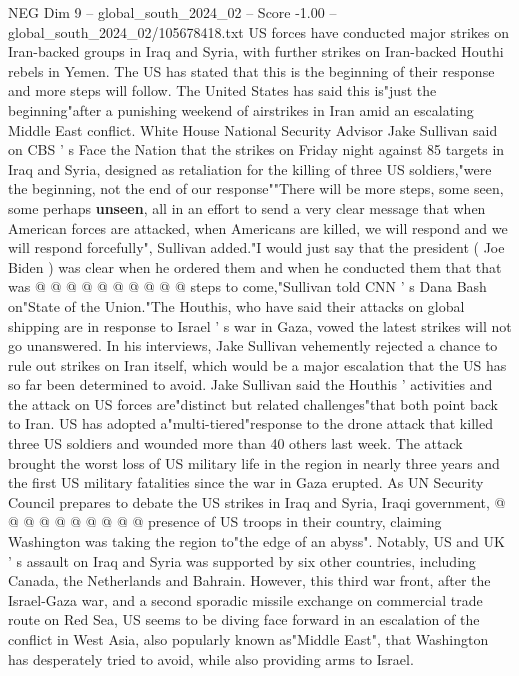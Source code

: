 \begin{textsample}{NEG Dim 9 – global\_south\_2024\_02 – Score -1.00 – global\_south\_2024\_02/105678418.txt}  \label{ex:f9_neg_364}
US forces have conducted major strikes on Iran-backed groups in Iraq and Syria, with further strikes on Iran-backed Houthi rebels in Yemen.
The US has stated that this is the beginning of their response and more steps will follow.
The United States has said this is"just the beginning"after a punishing weekend of airstrikes in Iran amid an escalating Middle East conflict.
White House National Security Advisor Jake Sullivan said on CBS ' s Face the Nation that the strikes on Friday night against 85 targets in Iraq and Syria, designed as retaliation for the killing of three US soldiers,"were the beginning, not the end of our response""There will be more steps, some seen, some perhaps \textbf{unseen}, all in an effort to send a very clear message that when American forces are attacked, when Americans are killed, we will respond and we will respond forcefully", Sullivan added."I would just say that the president ( Joe Biden ) was clear when he ordered them and when he conducted them that that was @ @ @ @ @ @ @ @ @ @ steps to come,"Sullivan told CNN ' s Dana Bash on"State of the Union."The Houthis, who have said their attacks on global shipping are in response to Israel ' s war in Gaza, vowed the latest strikes will not go unanswered.
In his interviews, Jake Sullivan vehemently rejected a chance to rule out strikes on Iran itself, which would be a major escalation that the US has so far been determined to avoid.
Jake Sullivan said the Houthis ' activities and the attack on US forces are"distinct but related challenges"that both point back to Iran.
US has adopted a"multi-tiered"response to the drone attack that killed three US soldiers and wounded more than 40 others last week.
The attack brought the worst loss of US military life in the region in nearly three years and the first US military fatalities since the war in Gaza erupted.
As UN Security Council prepares to debate the US strikes in Iraq and Syria, Iraqi government, @ @ @ @ @ @ @ @ @ @ presence of US troops in their country, claiming Washington was taking the region to"the edge of an abyss".
Notably, US and UK ' s assault on Iraq and Syria was supported by six other countries, including Canada, the Netherlands and Bahrain.
However, this third war front, after the Israel-Gaza war, and a second sporadic missile exchange on commercial trade route on Red Sea, US seems to be diving face forward in an escalation of the conflict in West Asia, also popularly known as"Middle East", that Washington has desperately tried to avoid, while also providing arms to Israel.

\end{textsample}
